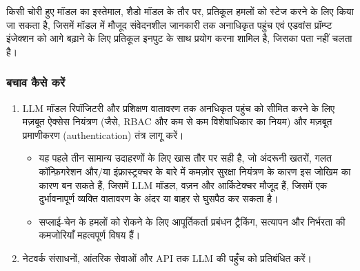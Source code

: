 \documentclass[
]{article}
\providecommand{\tightlist}{%
  \setlength{\itemsep}{0pt}\setlength{\parskip}{0pt}}
\begin{document}
किसी चोरी हुए मॉडल का इस्तेमाल, शैडो मॉडल के तौर पर, प्रतिकूल हमलों को स्टेज करने के
लिए किया जा सकता है, जिसमें मॉडल में मौजूद संवेदनशील जानकारी तक अनाधिकृत पहुंच एवं
एडवांस प्रॉम्प्ट इंजेक्शन को आगे बढ़ाने के लिए प्रतिकूल इनपुट के साथ प्रयोग करना शामिल
है, जिसका पता नहीं चलता है।

\subsubsection{बचाव कैसे करें}\label{ux92cux91aux935-ux915ux938-ux915ux930}

\begin{enumerate}
\def\labelenumi{\arabic{enumi}.}
\tightlist
\item
  LLM मॉडल रिपॉजिटरी और प्रशिक्षण वातावरण तक अनधिकृत पहुंच को सीमित करने के लिए
  मज़बूत ऐक्सेस नियंत्रण (जैसे, RBAC और कम से कम विशेषाधिकार का नियम) और मज़बूत
  प्रमाणीकरण (authentication) तंत्र लागू करें।

  \begin{itemize}
  \tightlist
  \item
    यह पहले तीन सामान्य उदाहरणों के लिए खास तौर पर सही है, जो अंदरूनी खतरों, गलत
    कॉन्फ़िगरेशन और/या इंफ्रास्ट्रक्चर के बारे में कमज़ोर सुरक्षा नियंत्रण के कारण इस
    जोखिम का कारण बन सकते हैं, जिसमें LLM मॉडल, वज़न और आर्किटेक्चर मौजूद हैं, जिसमें
    एक दुर्भावनापूर्ण व्यक्ति वातावरण के अंदर या बाहर से घुसपैठ कर सकता है।
  \item
    सप्लाई-चेन के हमलों को रोकने के लिए आपूर्तिकर्ता प्रबंधन ट्रैकिंग, सत्यापन और
    निर्भरता की कमजोरियाँ महत्वपूर्ण विषय हैं।
  \end{itemize}
\item
  नेटवर्क संसाधनों, आंतरिक सेवाओं और API तक LLM की पहुँच को प्रतिबंधित करें।


\end{enumerate}
\end{document}
